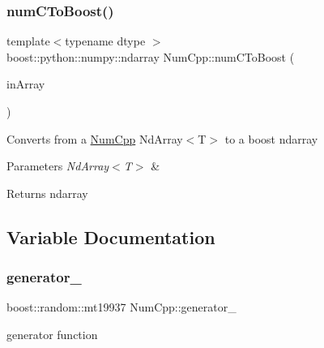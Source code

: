 \subsubsection{\texorpdfstring{num\+C\+To\+Boost()}{numCToBoost()}}
{\footnotesize\ttfamily template$<$typename dtype $>$ \\
boost\+::python\+::numpy\+::ndarray Num\+Cpp\+::num\+C\+To\+Boost (\begin{DoxyParamCaption}\item[{const \mbox{\hyperlink{class_num_cpp_1_1_nd_array}{Nd\+Array}}$<$ dtype $>$ \&}]{in\+Array }\end{DoxyParamCaption})}

Converts from a \mbox{\hyperlink{namespace_num_cpp}{Num\+Cpp}} Nd\+Array$<$\+T$>$ to a boost ndarray


\begin{DoxyParams}{Parameters}
{\em Nd\+Array$<$\+T$>$} & \\
\hline
\end{DoxyParams}
\begin{DoxyReturn}{Returns}
ndarray 
\end{DoxyReturn}


\subsection{Variable Documentation}
\mbox{\label{namespace_num_cpp_a89b9a902970eecc0ec84aa6d29711fe6}} 
\subsubsection{\texorpdfstring{generator\+\_\+}{generator\_}}
{\footnotesize\ttfamily boost\+::random\+::mt19937 Num\+Cpp\+::generator\+\_\+}



generator function 

